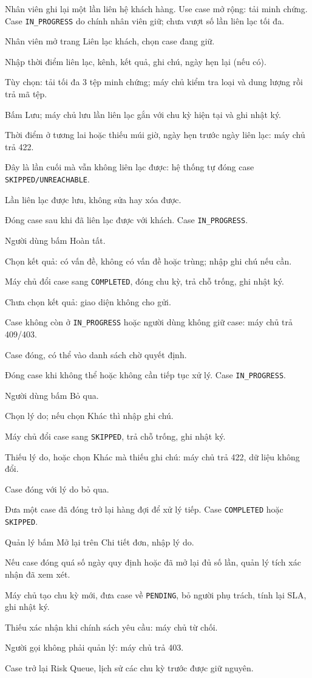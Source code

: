 {Nhân viên ghi lại một lần liên hệ khách hàng. Use case mở rộng: tải minh chứng.}
{Case \texttt{IN\_PROGRESS} do chính nhân viên giữ; chưa vượt số lần liên lạc tối đa.}
{\item Nhân viên mở trang Liên lạc khách, chọn case đang giữ.
 \item Nhập thời điểm liên lạc, kênh, kết quả, ghi chú, ngày hẹn lại (nếu có).
 \item Tùy chọn: tải tối đa 3 tệp minh chứng; máy chủ kiểm tra loại và dung lượng rồi trả mã tệp.
 \item Bấm Lưu; máy chủ lưu lần liên lạc gắn với chu kỳ hiện tại và ghi nhật ký.}
{\item Thời điểm ở tương lai hoặc thiếu múi giờ, ngày hẹn trước ngày liên lạc: máy chủ trả 422.
 \item Đây là lần cuối mà vẫn không liên lạc được: hệ thống tự đóng case \texttt{SKIPPED/UNREACHABLE}.}
{Lần liên lạc được lưu, không sửa hay xóa được.}

{Đóng case sau khi đã liên lạc được với khách.}
{Case \texttt{IN\_PROGRESS}.}
{\item Người dùng bấm Hoàn tất.
 \item Chọn kết quả: có vấn đề, không có vấn đề hoặc trùng; nhập ghi chú nếu cần.
 \item Máy chủ đổi case sang \texttt{COMPLETED}, đóng chu kỳ, trả chỗ trống, ghi nhật ký.}
{\item Chưa chọn kết quả: giao diện không cho gửi.
 \item Case không còn ở \texttt{IN\_PROGRESS} hoặc người dùng không giữ case: máy chủ trả 409/403.}
{Case đóng, có thể vào danh sách chờ quyết định.}

{Đóng case khi không thể hoặc không cần tiếp tục xử lý.}
{Case \texttt{IN\_PROGRESS}.}
{\item Người dùng bấm Bỏ qua.
 \item Chọn lý do; nếu chọn Khác thì nhập ghi chú.
 \item Máy chủ đổi case sang \texttt{SKIPPED}, trả chỗ trống, ghi nhật ký.}
{\item Thiếu lý do, hoặc chọn Khác mà thiếu ghi chú: máy chủ trả 422, dữ liệu không đổi.}
{Case đóng với lý do bỏ qua.}

{Đưa một case đã đóng trở lại hàng đợi để xử lý tiếp.}
{Case \texttt{COMPLETED} hoặc \texttt{SKIPPED}.}
{\item Quản lý bấm Mở lại trên Chi tiết đơn, nhập lý do.
 \item Nếu case đóng quá số ngày quy định hoặc đã mở lại đủ số lần, quản lý tích xác nhận đã xem xét.
 \item Máy chủ tạo chu kỳ mới, đưa case về \texttt{PENDING}, bỏ người phụ trách, tính lại SLA, ghi nhật ký.}
{\item Thiếu xác nhận khi chính sách yêu cầu: máy chủ từ chối.
 \item Người gọi không phải quản lý: máy chủ trả 403.}
{Case trở lại Risk Queue, lịch sử các chu kỳ trước được giữ nguyên.}

